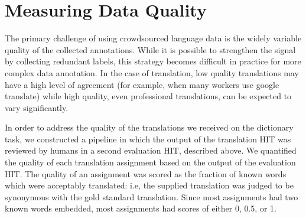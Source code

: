\documentclass[11pt]{article}
\begin{document}


\section{Measuring Data Quality}
The primary challenge of using crowdsourced language data is the widely variable quality of the collected annotations. While it is possible to strengthen the signal by collecting redundant labels, this strategy becomes difficult in practice for more complex data annotation. In the case of translation, low quality translations may have a high level of agreement (for example, when many workers use google translate) while high quality, even professional translations, can be expected to vary significantly.
 
In order to address the quality of the translations we received on the dictionary task, we constructed a pipeline in which the output of the translation HIT was reviewed by humans in a second evaluation HIT, described above. We quantified the quality of each translation assignment based on the output of the evaluation HIT. The quality of an assignment was scored as the fraction of known words which were acceptably translated: i.e, the supplied translation was judged to be synonymous with the gold standard translation. Since most assignments had two known words embedded, most assignments had scores of either 0, 0.5, or 1.


\end{document}
